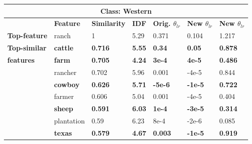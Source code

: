 \begin{table}[htbp]
\centering
\begin{tabular}{lllllll}
\multicolumn{7}{c}{\textbf{Class: Western}} \\ \hline
\multicolumn{1}{l|}{\textbf{}} & \multicolumn{1}{l|}{\textbf{Feature}} & \multicolumn{1}{l|}{\textbf{Similarity}} & \multicolumn{1}{l|}{\textbf{IDF}} & \multicolumn{1}{l|}{\textbf{Orig. $\theta_{lr}$}} & \multicolumn{1}{l|}{\textbf{New $\theta_{lr}$}} & \textbf{New $\theta_{lr}$} \\ \hline
\multicolumn{1}{l|}{\textbf{Top-feature}} & \multicolumn{1}{l|}{ranch} & \multicolumn{1}{l|}{1} & \multicolumn{1}{l|}{5.29} & \multicolumn{1}{l|}{0.371} & \multicolumn{1}{l|}{0.104} & 1.217 \\ \hline
\multicolumn{1}{l|}{\textbf{Top-similar}} & \multicolumn{1}{l|}{\textbf{cattle}} & \multicolumn{1}{l|}{\textbf{0.716}} & \multicolumn{1}{l|}{\textbf{5.55}} & \multicolumn{1}{l|}{\textbf{0.34}} & \multicolumn{1}{l|}{\textbf{0.05}} & \textbf{0.878} \\
\multicolumn{1}{l|}{\textbf{features}} & \multicolumn{1}{l|}{\textbf{farm}} & \multicolumn{1}{l|}{\textbf{0.705}} & \multicolumn{1}{l|}{\textbf{4.24}} & \multicolumn{1}{l|}{\textbf{3e-4}} & \multicolumn{1}{l|}{\textbf{4e-5}} & \textbf{0.486} \\
\multicolumn{1}{l|}{} & \multicolumn{1}{l|}{rancher} & \multicolumn{1}{l|}{0.702} & \multicolumn{1}{l|}{5.96} & \multicolumn{1}{l|}{0.001} & \multicolumn{1}{l|}{-4e-5} & 0.844 \\
\multicolumn{1}{l|}{\textbf{}} & \multicolumn{1}{l|}{\textbf{cowboy}} & \multicolumn{1}{l|}{\textbf{0.626}} & \multicolumn{1}{l|}{\textbf{5.71}} & \multicolumn{1}{l|}{\textbf{-5e-6}} & \multicolumn{1}{l|}{\textbf{-1e-5}} & \textbf{0.722} \\
\multicolumn{1}{l|}{} & \multicolumn{1}{l|}{farmer} & \multicolumn{1}{l|}{0.606} & \multicolumn{1}{l|}{5.04} & \multicolumn{1}{l|}{0.001} & \multicolumn{1}{l|}{-4e-5} & 0.404 \\
\multicolumn{1}{l|}{} & \multicolumn{1}{l|}{\textbf{sheep}} & \multicolumn{1}{l|}{\textbf{0.591}} & \multicolumn{1}{l|}{\textbf{6.03}} & \multicolumn{1}{l|}{\textbf{1e-4}} & \multicolumn{1}{l|}{\textbf{-3e-5}} & \textbf{0.314} \\
\multicolumn{1}{l|}{\textbf{}} & \multicolumn{1}{l|}{plantation} & \multicolumn{1}{l|}{0.59} & \multicolumn{1}{l|}{6.23} & \multicolumn{1}{l|}{8e-4} & \multicolumn{1}{l|}{-2e-6} & 0.085 \\
\multicolumn{1}{l|}{} & \multicolumn{1}{l|}{\textbf{texas}} & \multicolumn{1}{l|}{\textbf{0.579}} & \multicolumn{1}{l|}{\textbf{4.67}} & \multicolumn{1}{l|}{\textbf{0.003}} & \multicolumn{1}{l|}{\textbf{-1e-5}} & \textbf{0.919} \\

\end{tabular}
\end{table}
